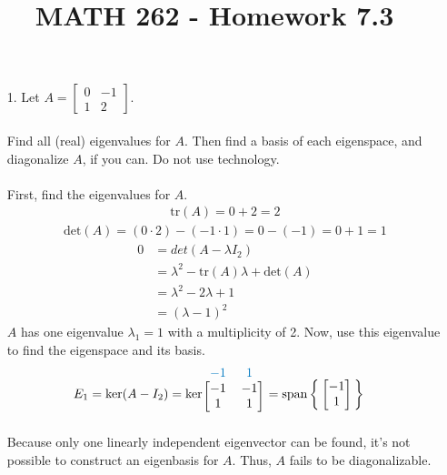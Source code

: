 \documentclass[letterpaper,12pt]{article}
\author{}
\title{MATH 262 - Homework 7.3}
\date{} %
\begin{document}
\maketitle

\begin{enumerate}
  \item[1.]
    Let $A = \begin{bmatrix}0 & -1 \\ 1 & 2\end{bmatrix}$. \\
    \\
    Find all (real) eigenvalues for $A$. Then find a basis of each eigenspace, and diagonalize $A$, if you can. Do not use technology. \\
    \\
    First, find the eigenvalues for $A$.
    \begin{align*}
      \text{tr}(A) = 0 + 2 = 2
    \end{align*}
    \begin{align*}
      \text{det}(A) = (0 \cdot 2) - (-1 \cdot 1) = 0 - (-1) = 0 + 1 = 1
    \end{align*}
    \begin{align*}
      0 &= det(A - \lambda I_2) \\
      &= \lambda^2 - \text{tr}(A)\lambda + \text{det}(A) \\
      &= \lambda^2 - 2\lambda + 1 \\
      &= (\lambda - 1)^2
    \end{align*}
    $A$ has one eigenvalue $\lambda_1 = 1$ with a multiplicity of 2. Now, use this eigenvalue to find the eigenspace and its basis. \\
    \begin{align*}
      E_1 &= \text{ker}(A - I_2)
      = \text{ker} \begin{blockarray}{cc}
        \textcolor{bookblue}{-1} & \textcolor{bookblue}{1} \\
        \begin{block}{[cc]}
          -1 & -1 \\
          1 & 1 \\
        \end{block}
      \end{blockarray}
      = \text{span}\Set{
        \begin{bmatrix}
          -1 \\ 1
        \end{bmatrix}
      }
    \end{align*}
    Because only one linearly independent eigenvector can be found, it's not possible to construct an eigenbasis for $A$. Thus, $A$ fails to be diagonalizable.

\end{enumerate}
\end{document}
